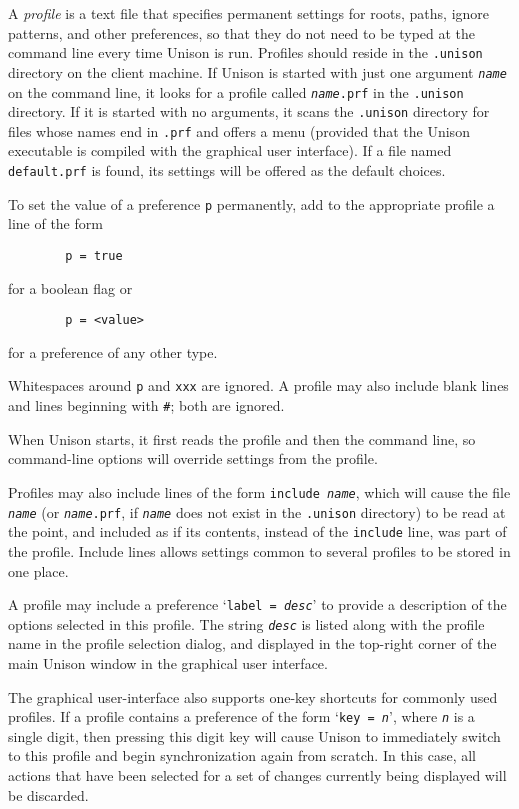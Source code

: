 \documentclass{article}
\newcommand{\ARG}[1]{\texttt{\textit{#1}}}
\begin{document}

A {\em profile} is a text file that specifies permanent settings for
roots, paths, ignore patterns, and other preferences, so that they do
not need to be typed at the command line every time Unison is run.
Profiles should reside in the \verb|.unison| directory on the client
machine.  If Unison is started with just one argument \ARG{name} on
the command line, it looks for a profile called \texttt{\ARG{name}.prf} in
the \verb|.unison| directory.  If it is started with no arguments, it
scans the \verb|.unison| directory for files whose names end in
\verb|.prf| and offers a menu (provided that the Unison executable is compiled with the graphical user interface).  If a file named \verb|default.prf| is
found, its settings will be offered as the default choices.

To set the value of a preference {\tt p} permanently, add to the
appropriate profile a line of the form
\begin{verbatim}
        p = true
\end{verbatim}
for a boolean flag or
\begin{verbatim}
        p = <value>
\end{verbatim}
for a preference of any other type.  

Whitespaces around {\tt p} and {\tt xxx} are ignored.
A profile may also include blank lines and lines beginning
with {\tt \#}; both are ignored.

When Unison starts, it first reads the profile and then the command
line, so command-line options will override settings from the
profile.  

Profiles may also include lines of the form \texttt{include
  \ARG{name}}, which will cause the file \ARG{name} (or
\texttt{\ARG{name}.prf}, if \ARG{name} does not exist in the
\verb+.unison+ directory) to be read at the point, and included as if
its contents, instead of the \texttt{include} line, was part of the
profile.  Include lines allows settings common to several profiles to
be stored in one place.

A profile may include a preference `\texttt{label = \ARG{desc}}' to
provide a description of the options selected in this profile.  The
string \ARG{desc} is listed along with the profile name in the profile
selection dialog, and displayed in the top-right corner of the main
Unison window in the graphical user interface.

The graphical user-interface also supports one-key shortcuts for commonly
used profiles.  If a profile contains a preference of the form 
%
`\texttt{key = \ARG{n}}', where \ARG{n} is a single digit, then
pressing this digit key will cause Unison to immediately switch to
this profile and begin synchronization again from scratch.  In this
case, all actions that have been selected for a set of changes
currently being displayed will be discarded.
\end{document}

